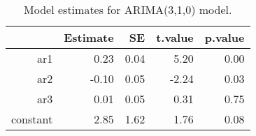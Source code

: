 \begin{table}[ht]
\centering
\begin{tabular}{rrrrr}
  \hline
 & Estimate & SE & t.value & p.value \\ 
  \hline
ar1 & 0.23 & 0.04 & 5.20 & 0.00 \\ 
  ar2 & -0.10 & 0.05 & -2.24 & 0.03 \\ 
  ar3 & 0.01 & 0.05 & 0.31 & 0.75 \\ 
  constant & 2.85 & 1.62 & 1.76 & 0.08 \\ 
   \hline
\end{tabular}
\caption{Model estimates for ARIMA(3,1,0) model.}
\end{table}

